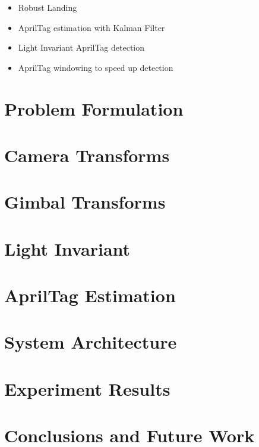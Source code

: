 \documentclass[letterpaper, 10 pt, conference]{ieeeconf}
\begin{document}
\begin{itemize}
  \item{Robust Landing}
  \item{AprilTag estimation with Kalman Filter}
  \item{Light Invariant AprilTag detection}
  \item{AprilTag windowing to speed up detection}
\end{itemize}

\section{Problem Formulation}

\section{Camera Transforms}

\section{Gimbal Transforms}

\section{Light Invariant}

\section{AprilTag Estimation}

\section{System Architecture}


\section{Experiment Results}



\section{Conclusions and Future Work}



\end{document}
